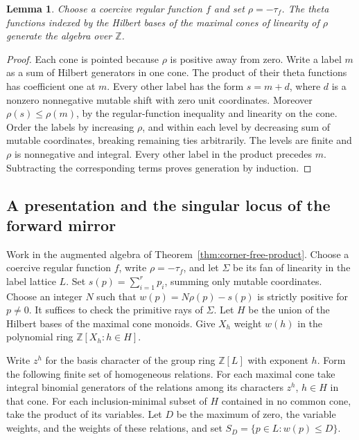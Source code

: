\documentclass[11pt,reqno]{amsart}
\numberwithin{equation}{section}
\newtheorem{lemma}[theorem]{Lemma}
\theoremstyle{definition}
\theoremstyle{remark}
\begin{document}
\begin{lemma}\label{lem:coercive-theta-generators}
Choose a coercive regular
function \(f\) and set \(\rho=-\tau_f\). The theta functions
indexed by the Hilbert bases of the maximal cones of linearity
of \(\rho\) generate the algebra over \(\mathbb Z\).
\end{lemma}
\begin{proof}
Each cone is pointed because \(\rho\) is positive away from zero.
Write a label \(m\) as a sum of Hilbert generators in one cone.
The product of their theta functions has coefficient one at \(m\).
Every other label has the form \(s=m+d\), where \(d\) is a nonzero
nonnegative mutable shift with zero unit coordinates.
Moreover \(\rho(s)\le\rho(m)\), by the regular-function
inequality and linearity on the cone. Order the labels by increasing
\(\rho\), and within each level by decreasing sum of mutable
coordinates, breaking remaining ties arbitrarily. The levels are
finite and \(\rho\) is nonnegative and integral. Every other label in the product precedes \(m\).
Subtracting the corresponding terms proves generation by induction.
\end{proof}

\subsection{A presentation and the singular locus of the forward mirror}

Work in the augmented algebra of Theorem~\ref{thm:corner-free-product}.
Choose a coercive regular function \(f\), write \(\rho=-\tau_f\), and
let \(\Sigma\) be its fan of linearity in the label lattice \(L\).
Set \(s(p)=\sum_{i=1}^r p_i\), summing only mutable coordinates.
Choose an integer \(N\) such that
\(w(p)=N\rho(p)-s(p)\) is strictly positive for \(p\ne0\).
It suffices to check the primitive rays of \(\Sigma\).
Let \(H\) be the union of the Hilbert bases of the maximal cone monoids.
Give \(X_h\) weight \(w(h)\) in the polynomial ring
\(\mathbb Z[X_h:h\in H]\).

Write \(z^h\) for the basis character of the group ring \(\mathbb Z[L]\)
with exponent \(h\). Form the following finite set of homogeneous relations. For each
maximal cone take integral binomial generators of the relations
among its characters \(z^h\), \(h\in H\) in that cone. For each
inclusion-minimal subset of \(H\) contained in no common cone, take the product
of its variables. Let \(D\) be the maximum of zero, the variable
weights, and the weights of these relations, and set
\(S_D=\{p\in L:w(p)\le D\}\).
\end{document}
